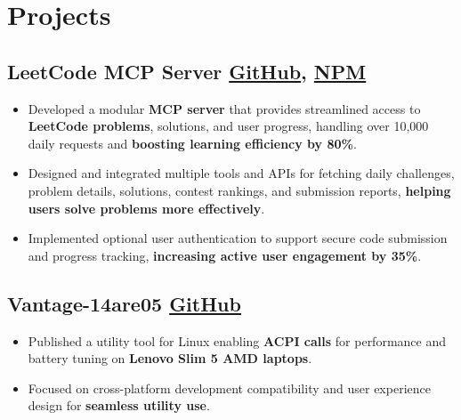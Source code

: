 \documentclass[10pt]{article}
\newcommand{\rside}[1]{
  \hfill {\small\color{accent} #1}%
}
\begin{document}
\section{Projects}
\subsection{LeetCode MCP Server \rside{\href{https://github.com/ayushjaipuriyar/leetcode-mcpserver}{GitHub}\hspace{0.1cm}, \href{https://www.npmjs.com/package/leetcode-mcpserver}{NPM}}}
\begin{itemize}
  \item Developed a modular \textbf{MCP server} that provides streamlined access to \textbf{LeetCode problems}, solutions, and user progress, handling over 10,000 daily requests and \textbf{boosting learning efficiency by 80\%}.
  \item Designed and integrated multiple tools and APIs for fetching daily challenges, problem details, solutions, contest rankings, and submission reports, \textbf{helping users solve problems more effectively}.
  \item Implemented optional user authentication to support secure code submission and progress tracking, \textbf{increasing active user engagement by 35\%}.
\end{itemize}

\subsection{Vantage-14are05 \rside{\href{https://github.com/ayushjaipuriyar/vantage-14are05}{GitHub}}}
\begin{itemize}
  \item Published a utility tool for Linux enabling \textbf{ACPI calls} for performance and battery tuning on \textbf{Lenovo Slim 5 AMD laptops}.
  \item Focused on cross-platform development compatibility and user experience design for \textbf{seamless utility use}.
\end{itemize}

\end{document}
